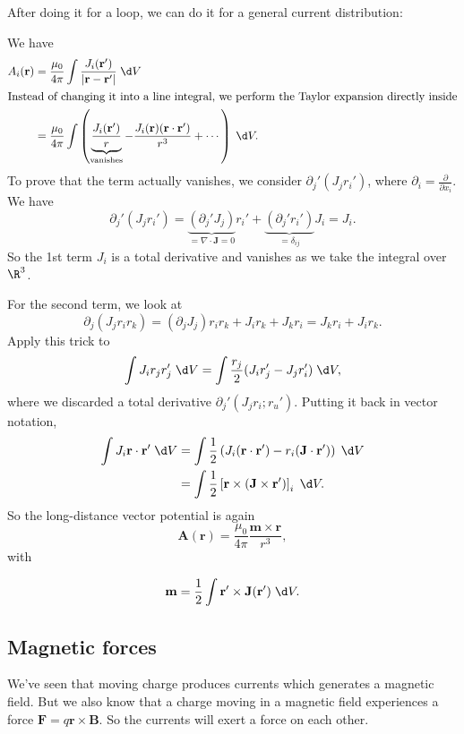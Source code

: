 \documentclass[a4paper]{article}
\begin{document}
After doing it for a loop, we can do it for a general current distribution:
\begin{eg}
  We have
  \begin{align*}
    A_i(\mathbf{r}) &= \frac{\mu_0}{4\pi}\int \frac{J_i(\mathbf{r}')}{|\mathbf{r} - \mathbf{r}'|}\;\d V\\
    \intertext{Instead of changing it into a line integral, we perform the Taylor expansion directly inside}
    &= \frac{\mu_0}{4\pi}\int\left(\underbrace{\frac{J_i(\mathbf{r}')}{r}}_{\text{vanishes}} - \frac{J_i(\mathbf{r})(\mathbf{r}\cdot \mathbf{r}')}{r^3} + \cdots\right)\;\d V.
  \end{align*}
  To prove that the term actually vanishes, we consider $\partial_j'(J_jr_i')$, where $\partial_i = \frac{\partial}{\partial x_i}$. We have
  \[
    \partial_j'(J_jr_i') = \underbrace{(\partial_j'J_j)}_{=\nabla\cdot \mathbf{J} = 0}r_i' + \underbrace{(\partial_j'r_i')}_{=\delta_{ij}}J_i = J_i.
  \]
  So the 1st term $J_i$ is a total derivative and vanishes as we take the integral over $\R^3$.

  For the second term, we look at
  \[
    \partial_j (J_jr_ir_k) = (\partial_jJ_j)r_ir_k + J_ir_k + J_kr_i =J_kr_i + J_ir_k.
  \]
  Apply this trick to 
  \[
    \int J_ir_jr'_j \;\d V = \int \frac{r_j}{2}(J_i r_j' - J_j r'_i)\;\d V,
  \]
  where we discarded a total derivative $\partial_j'(J_jr_i;r_u')$. Putting it back in vector notation,
  \begin{align*}
    \int J_i\mathbf{r}\cdot \mathbf{r}'\;\d V &= \int\frac{1}{2}\left(J_i(\mathbf{r}\cdot \mathbf{r}') - r_i(\mathbf{J}\cdot \mathbf{r}')\right)\;\d V\\
    &= \int \frac{1}{2}\left[\mathbf{r}\times (\mathbf{J}\times \mathbf{r}')\right]_i\;\d V.
  \end{align*}
  So the long-distance vector potential is again
  \[
    \mathbf{A} (\mathbf{r}) = \frac{\mu_0}{4\pi}\frac{\mathbf{m}\times \mathbf{r}}{r^3},
  \]
  with
  \begin{defi}
    \[
      \mathbf{m} = \frac{1}{2}\int \mathbf{r}'\times \mathbf{J}(\mathbf{r}')\;\d V.
    \]
  \end{defi}
\end{eg}

\subsection{Magnetic forces}
We've seen that moving charge produces currents which generates a magnetic field. But we also know that a charge moving in a magnetic field experiences a force $\mathbf{F} = q\mathbf{r}\times \mathbf{B}$. So the currents will exert a force on each other.
\end{document}
